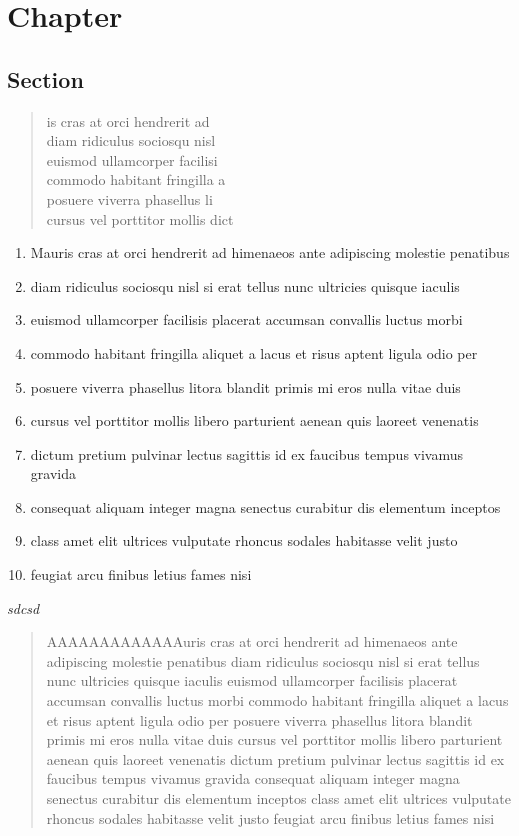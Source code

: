 \chapter{Chapter}

\section{Section}


\begin{verse}
is cras at orci hendrerit ad\\
diam ridiculus sociosqu nisl\\
euismod ullamcorper facilisi\\
commodo habitant fringilla a\\
posuere viverra phasellus li\\
cursus vel porttitor mollis dict
\end{verse}

\begin{enumerate}[itemsep=2pt]
\item Mauris cras at orci hendrerit ad himenaeos ante adipiscing molestie penatibus
\item diam ridiculus sociosqu nisl si erat tellus nunc ultricies quisque iaculis
\item euismod ullamcorper facilisis placerat accumsan convallis luctus morbi
\item commodo habitant fringilla aliquet a lacus et risus aptent ligula odio per
\item posuere viverra phasellus litora blandit primis mi eros nulla vitae duis
\item cursus vel porttitor mollis libero parturient aenean quis laoreet venenatis
\item dictum pretium pulvinar lectus sagittis id ex faucibus tempus vivamus gravida
\item consequat aliquam integer magna senectus curabitur dis elementum inceptos
\item class amet elit ultrices vulputate rhoncus sodales habitasse velit justo
\item feugiat arcu finibus letius fames nisi
\end{enumerate}

\newcommand{\num}[1]{\textit{#1}}

\num{sdcsd}

\begin{quote}
AAAAAAAAAAAAAuris cras at orci hendrerit ad himenaeos ante adipiscing molestie penatibus
diam ridiculus sociosqu nisl si erat tellus nunc ultricies quisque iaculis
euismod ullamcorper facilisis placerat accumsan convallis luctus morbi
commodo habitant fringilla aliquet a lacus et risus aptent ligula odio per
posuere viverra phasellus litora blandit primis mi eros nulla vitae duis
cursus vel porttitor mollis libero parturient aenean quis laoreet venenatis
dictum pretium pulvinar lectus sagittis id ex faucibus tempus vivamus gravida
consequat aliquam integer magna senectus curabitur dis elementum inceptos
class amet elit ultrices vulputate rhoncus sodales habitasse velit justo
feugiat arcu finibus letius fames nisi
\end{quote}


